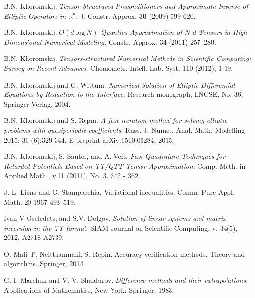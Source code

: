 \documentclass[amstex,amstext,amsfonts,epsf,12pt] {amsart}
\begin{document}
\begin{thebibliography}{99}
 B.N. Khoromskij.
  \emph{Tensor-Structured Preconditioners and Approximate Inverse
of Elliptic Operators in  $\mathbb{R}^d $.} J. Constr. Approx. {\bf 30} (2009) 599-620.

 B.N. Khoromskij.
\emph{$O(d\log N)$-Quantics Approximation of $N$-$d$ Tensors in High-Dimensional
Numerical Modeling.}
Constr. Approx. 34  (2011) 257--280.

   B.N. Khoromskij. \emph{Tensors-structured
Numerical Methods in Scientific Computing: Survey on Recent Advances.}
Chemometr. Intell. Lab. Syst. 110 (2012), 1-19.

B.N. Khoromskij and G. Wittum. {\it Numerical Solution of Elliptic
Differential Equations by Reduction to the Interface}.
Research monograph,  LNCSE, No. 36, Springer-Verlag, 2004.


  B.N. Khoromskij and S. Repin.
\emph{A fast iteration method for solving elliptic problems with quasiperiodic coefficients}. 
Russ. J. Numer. Anal. Math. Modelling 2015; 30 (6):329-344.  
E-preprint arXiv:1510.00284, 2015.

 B.N. Khoromskij, S. Sauter, and A. Veit. 
\emph{Fast Quadrature 
Techniques for Retarded Potentials Based on TT/QTT Tensor Approximation.} 
Comp. Meth. in Applied Math., v.11 (2011), No. 3, 342 - 362.


J.-L. Lions and G. Stampacchia.
 Variational inequalities. Comm. Pure Appl. Math. 20 1967 493--519. 

 Ivan V Oseledets, and  S.V. Dolgov.
 \emph{Solution of linear systems and matrix inversion in the TT-format. }
 SIAM Journal on Scientific Computing, v. 34(5), 2012, A2718-A2739.
 
O. Mali, P. Neittaanmaki, S. Repin.
Accuracy verification methods. Theory and algorithms.
Springer, 2014

 G. I. Marchuk and V. V. Shaidurov.
\emph{Difference methods and their extrapolations}.
Applications of Mathematics, New York: Springer, 1983.



\end{thebibliography}
\end{document}
